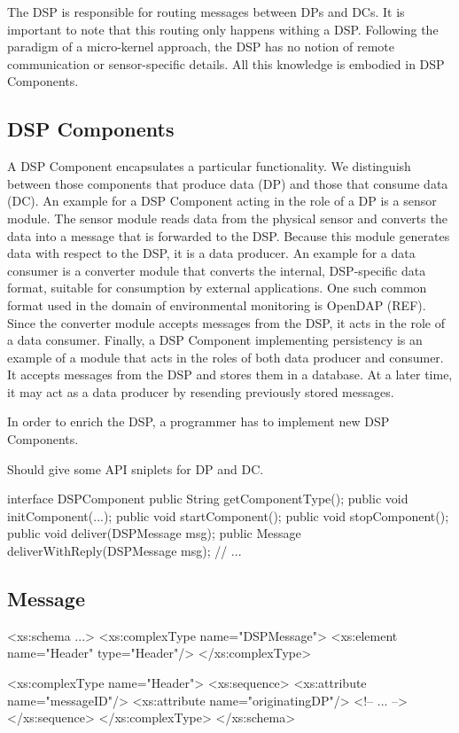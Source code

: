 \documentclass[conference]{IEEEtran}
\begin{document}
The DSP is responsible for routing messages between DPs and DCs. It is
important to note that this routing only happens withing a
DSP. Following the paradigm of a micro-kernel approach, the DSP has no
notion of remote communication or sensor-specific details. All this
knowledge is embodied in DSP Components.

\subsection{DSP Components}

A DSP Component encapsulates a particular functionality. We
distinguish between those components that produce data (DP) and those
that consume data (DC). An example for a DSP Component acting in the
role of a DP is a sensor module. The sensor module reads data from the
physical sensor and converts the data into a message that is forwarded
to the DSP. Because this module generates data with respect to the
DSP, it is a data producer. An example for a data consumer is a
converter module that converts the internal, DSP-specific data format,
suitable for consumption by external applications. One such common
format used in the domain of environmental monitoring is OpenDAP
(REF). Since the converter module accepts messages from the DSP, it
acts in the role of a data consumer. Finally, a DSP Component
implementing persistency is an example of a module that acts in the
roles of both data producer and consumer. It accepts messages from the
DSP and stores them in a database. At a later time, it may act as a
data producer by resending previously stored messages.

In order to enrich the DSP, a programmer has to implement new DSP
Components. 

Should give some API sniplets for DP and DC.

\begin{code}
interface DSPComponent
{
   public String getComponentType();
   public void initComponent(...);
   public void startComponent();
   public void stopComponent();
   public void deliver(DSPMessage msg);
   public Message deliverWithReply(DSPMessage msg);
   // ...
}
\end{code}


\subsection{Message}

\begin{code}
<xs:schema ...>
  <xs:complexType name="DSPMessage">
    <xs:element name="Header" type="Header"/>
  </xs:complexType>

  <xs:complexType name="Header">
    <xs:sequence>
      <xs:attribute name="messageID"/>
      <xs:attribute name="originatingDP"/>
      <!-- ... -->
    </xs:sequence>
  </xs:complexType>
</xs:schema>
\end{code}
\end{document}
